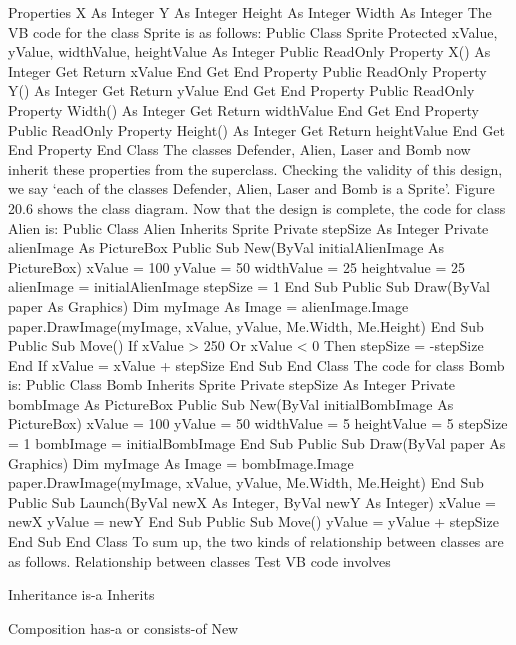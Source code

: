 Properties
X As Integer
Y As Integer
Height As Integer
Width As Integer
The VB code for the class Sprite is as follows:
Public Class Sprite
	Protected xValue, yValue, widthValue, heightValue As Integer
	Public ReadOnly Property X() As Integer
		Get
			Return xValue
		End Get
	End Property
	Public ReadOnly Property Y() As Integer
		Get
			Return yValue
		End Get
	End Property
	Public ReadOnly Property Width() As Integer
		Get
			Return widthValue
		End Get
	End Property
	Public ReadOnly Property Height() As Integer
		Get
			Return heightValue
		End Get
	End Property
End Class
The classes Defender, Alien, Laser and Bomb now inherit these properties from the superclass. Checking the validity of this design, we say ‘each of the classes Defender, Alien, Laser and Bomb is a Sprite’. Figure 20.6 shows the class diagram.
Now that the design is complete, the code for class Alien is:
Public Class Alien
	Inherits Sprite
	Private stepSize As Integer
	Private alienImage As PictureBox
Public Sub New(ByVal initialAlienImage As PictureBox)
	xValue = 100
	yValue = 50
	widthValue = 25
	heightvalue = 25
	alienImage = initialAlienImage
	stepSize = 1
End Sub
Public Sub Draw(ByVal paper As Graphics)
	Dim myImage As Image = alienImage.Image
	paper.DrawImage(myImage, xValue, yValue, Me.Width, Me.Height)
End Sub
Public Sub Move()
	If xValue > 250 Or xValue < 0 Then
		stepSize = -stepSize
	End If
	xValue = xValue + stepSize
	End Sub
End Class
The code for class Bomb is:
Public Class Bomb
	Inherits Sprite
	Private stepSize As Integer
	Private bombImage As PictureBox
	Public Sub New(ByVal initialBombImage As PictureBox)
		xValue = 100
		yValue = 50
		widthValue = 5
		heightValue = 5
		stepSize = 1
		bombImage = initialBombImage
	End Sub
	Public Sub Draw(ByVal paper As Graphics)
		Dim myImage As Image = bombImage.Image
		paper.DrawImage(myImage, xValue, yValue, Me.Width, Me.Height)
	End Sub
	Public Sub Launch(ByVal newX As Integer, ByVal newY As Integer)
		xValue = newX
		yValue = newY
	End Sub
	Public Sub Move()
		yValue = yValue + stepSize
	End Sub
End Class
To sum up, the two kinds of relationship between classes are as follows.
Relationship 
between classes	Test	VB code involves

Inheritance	is-a	Inherits

Composition	has-a or consists-of	New


